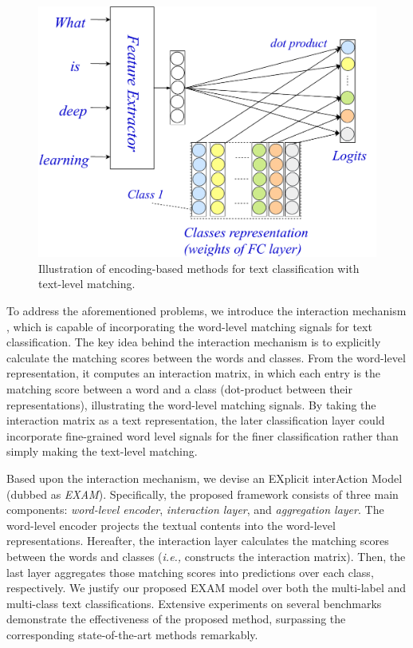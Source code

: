 \documentclass[letterpaper]{article} %
\newcommand{\ie}{\emph{i.e., }}
\begin{document}
\begin{figure}[htbp] \centering    
	\includegraphics[width=0.9\columnwidth]{fig1a.pdf} 
	\caption{Illustration of encoding-based methods for text classification with text-level matching.}     
	\label{dense_intro}
\end{figure}

To address the aforementioned problems, we introduce the interaction mechanism \cite{llstm}, which is capable of incorporating the word-level matching signals for text classification. The key idea behind the interaction mechanism is to explicitly calculate the matching scores between the words and classes. From the word-level representation, it computes an interaction matrix, in which each entry is the matching score between a word and a class (dot-product between their representations), illustrating the word-level matching signals. By taking the interaction matrix as a text representation, the later classification layer could  incorporate fine-grained word level signals for the finer classification rather than simply making the text-level matching.

Based upon the interaction mechanism, we devise an EXplicit interAction Model (dubbed as \textit{EXAM}). Specifically, the proposed framework consists of three main components: \textit{word-level encoder}, \textit{interaction layer}, and \textit{aggregation layer}. The word-level encoder projects the textual contents into the word-level representations. Hereafter, the interaction layer calculates the matching scores between the words and classes (\ie constructs the interaction matrix). Then, the last layer aggregates those matching scores into predictions over each class, respectively. We justify our proposed EXAM model over both the multi-label and multi-class text classifications. Extensive experiments on several benchmarks demonstrate the effectiveness of the proposed method, surpassing the corresponding state-of-the-art methods remarkably. 
\end{document}

